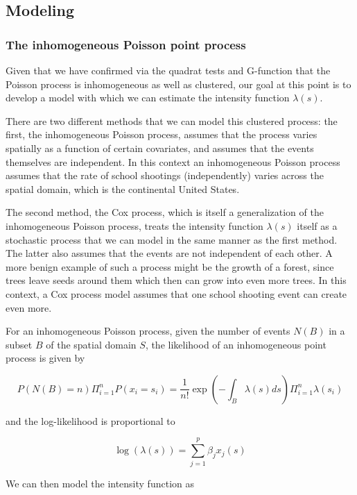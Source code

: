 \documentclass[
  12pt,
]{article}
\begin{document}
\hypertarget{modeling}{%
\subsection{Modeling}\label{modeling}}

\hypertarget{the-inhomogeneous-poisson-point-process}{%
\subsubsection{The inhomogeneous Poisson point
process}\label{the-inhomogeneous-poisson-point-process}}

Given that we have confirmed via the quadrat tests and G-function that
the Poisson process is inhomogeneous as well as clustered, our goal at
this point is to develop a model with which we can estimate the
intensity function \(\lambda(s)\).

There are two different methods that we can model this clustered
process: the first, the inhomogeneous Poisson process, assumes that the
process varies spatially as a function of certain covariates, and
assumes that the events themselves are independent. In this context an
inhomogeneous Poisson process assumes that the rate of school shootings
(independently) varies across the spatial domain, which is the
continental United States.

The second method, the Cox process, which is itself a generalization of
the inhomogeneous Poisson process, treats the intensity function
\(\lambda(s)\) itself as a stochastic process that we can model in the
same manner as the first method. The latter also assumes that the events
are not independent of each other. A more benign example of such a
process might be the growth of a forest, since trees leave seeds around
them which then can grow into even more trees. In this context, a Cox
process model assumes that one school shooting event can create even
more.

For an inhomogeneous Poisson process, given the number of events
\(N(B)\) in a subset \(B\) of the spatial domain \(S\), the likelihood
of an inhomogeneous point process is given by

\[P(N(B) = n) \Pi^n_{i=1} P(x_i = s_i) = \frac{1}{n!} \exp(- \int_B \lambda(s) ds) \Pi^n_{i=1} \lambda(s_i)\]

and the log-likelihood is proportional to

\[\log(\lambda(s))= \sum_{j=1}^p \beta_j x_j(s)\]

We can then model the intensity function as
\end{document}
